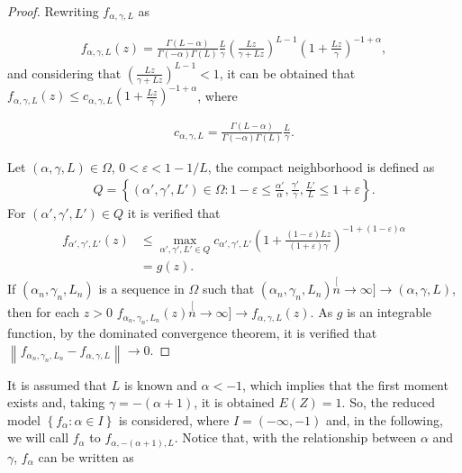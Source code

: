 \documentclass[journal]{IEEEtran}
\numberwithin{equation}{section}
\newenvironment{dem}[1][Proof]{\begin{proof}[{\it #1}]}{\end{proof}}
\newcommand{\norm}[1]{\ensuremath{\left\| #1 \right\|}}
\newcommand{\pa}[1]{\ensuremath{\left( #1 \right)}}
\newcommand{\set}[1]{\ensuremath{\left\{ #1 \right\}}}
\begin{document}
\begin{dem}
	Rewriting $f_{\alpha,\gamma,L}$ as
	
	\begin{align*}
	f_{\alpha,\gamma,L}\pa{z}= \frac{\Gamma\pa{L-\alpha}}{\Gamma\pa{-\alpha}\Gamma\pa{L}}
	\frac{L}{\gamma}\pa{\frac{Lz}{\gamma+Lz}}^{L-1}
	\pa{1+\frac{Lz}{\gamma}}^{-1+\alpha},
	\end{align*}
	and considering that $\pa{\frac{Lz}{\gamma+Lz}}^{L-1}<1$, it can be obtained that
	$f_{\alpha,\gamma,L}\pa{z} \le c_{\alpha,\gamma,L} \pa{1+\frac{Lz}{\gamma}}^{-1+\alpha}$, where
	
	\begin{align*}
	c_{\alpha,\gamma,L} = \frac{\Gamma\pa{L-\alpha}}{\Gamma\pa{-\alpha}\Gamma\pa{L}}
	\frac{L}{\gamma}.
	\end{align*}
	
	Let $\pa{\alpha,\gamma,L}\in\Omega$, $0<\varepsilon<1-1/L$, 
	the compact neighborhood is defined as
	\begin{align*}
	Q=\set{\pa{\alpha',\gamma',L'}\in\Omega:
		1-\varepsilon\le \textstyle{\frac{\alpha'}{\alpha},\frac{\gamma'}{\gamma},\frac{L'}{L}} \le 1+\varepsilon}.
	\end{align*}
	For $\pa{\alpha',\gamma',L'}\in Q$ it is verified that %
	\begin{align*}
	f_{\alpha',\gamma',L'}\pa{z} 
	&\le \max\limits_{{\alpha',\gamma',L'}\in Q}c_{\alpha',\gamma',L'}
	\pa{1+\frac{\pa{1-\varepsilon}Lz}{\pa{1+\varepsilon}\gamma}}^{-1+\pa{1-\varepsilon}\alpha} \\
	&= g\pa{z}.
	\end{align*}
	If $\pa{\alpha_{n},\gamma_{n},L_{n}}$ is a sequence in $\Omega$ such that $\pa{\alpha_{n},\gamma_{n},L_{n}}\stackrel[n\to\infty]{}{\longrightarrow}\pa{\alpha,\gamma,L}$, then for each $z>0$
	$f_{\alpha_{n},\gamma_{n},L_{n}}\pa{z}\stackrel[n\to\infty]{}{\longrightarrow} f_{\alpha,\gamma,L}\pa{z}$.
	As $g$ is an integrable function, by the dominated convergence theorem, it is verified that
	$\norm{f_{\alpha_{n},\gamma_{n},L_{n}} - f_{\alpha,\gamma,L}}\to 0$.
\end{dem}

\vspace{0.2cm}

It is assumed that  $L$ is known and $\alpha<-1$, which implies that the first moment exists and, 
taking $\gamma = -\pa{\alpha+1}$, it is obtained $E(Z) = 1$.
So, the reduced model $\set{f_{\alpha}:\alpha\in I}$ is considered,
where $I = \pa{-\infty,-1}\label{I}$ and, in the following, we will call $f_{\alpha}$ to $f_{\alpha,-\pa{\alpha+1},L}$.
Notice that, with the relationship between $\alpha$ and $\gamma$, $f_{\alpha}$ can be written as
\end{document}
